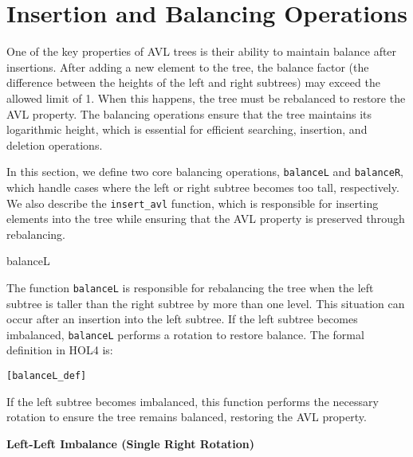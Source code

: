 \chapter{Insertion and Balancing Operations}\label{chap:LaTeXAdvice}

One of the key properties of AVL trees is their ability to maintain balance after insertions. After adding a new element to the tree, the balance factor (the difference between the heights of the left and right subtrees) may exceed the allowed limit of 1. When this happens, the tree must be rebalanced to restore the AVL property. The balancing operations ensure that the tree maintains its logarithmic height, which is essential for efficient searching, insertion, and deletion operations.

In this section, we define two core balancing operations, \texttt{balanceL} and \texttt{balanceR}, which handle cases where the left or right subtree becomes too tall, respectively. We also describe the \texttt{insert\_avl} function, which is responsible for inserting elements into the tree while ensuring that the AVL property is preserved through rebalancing.



\begin{defn}{balanceL}

The function \texttt{balanceL} is responsible for rebalancing the tree when the left subtree is taller than the right subtree by more than one level. This situation can occur after an insertion into the left subtree. If the left subtree becomes imbalanced, \texttt{balanceL} performs a rotation to restore balance. The formal definition in HOL4 is:

\begin{alltt}
	[balanceL_def]
\end{alltt}


If the left subtree becomes imbalanced, this function performs the necessary rotation to ensure the tree remains balanced, restoring the AVL property.
\end{defn}

\textbf{Left-Left Imbalance (Single Right Rotation)}
\begin{center}
\end{center}

